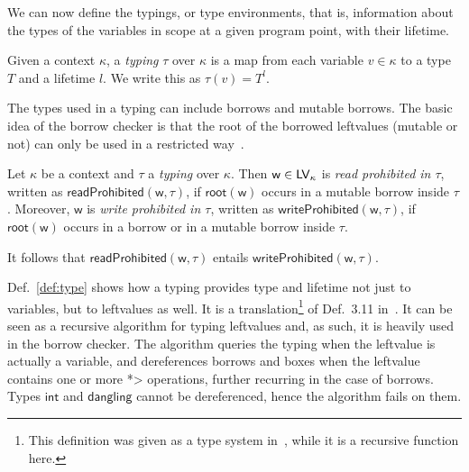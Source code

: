 We can now define the typings, or type environments, that is,
information about the types of the variables in scope at a given program point,
with their lifetime.

\begin{definition}[Typing]\label{def:typing}
  Given a context $\kappa$, a \emph{typing} $\tau$ over $\kappa$ is
  a map from each variable $v\in\kappa$ to a type $T$ and a lifetime $l$.
  We write this as $\tau(v)=T^l$.
\end{definition}

The types used in a typing can include borrows and mutable borrows.
The basic idea of the borrow checker is that the root of the
borrowed leftvalues (mutable or not) can only be used
in a restricted way~\cite{Pea21}.

\begin{definition}\label{def:prohibited}
  Let $\kappa$ be a context and $\tau$ a \emph{typing} over $\kappa$.
  Then $\mathsf{w}\in\mathsf{LV}_\kappa$ is
  \emph{read prohibited in $\tau$},
  written as $\mathsf{readProhibited}(\mathsf{w},\tau)$,
  if $\mathsf{root}(\mathsf{w})$ occurs in a mutable borrow inside $\tau$.
  Moreover, $\mathsf{w}$ is \emph{write prohibited in $\tau$}, written
  as $\mathsf{writeProhibited}(\mathsf{w},\tau)$,
  if $\mathsf{root}(\mathsf{w})$ occurs in a borrow or in a
  mutable borrow inside $\tau$.
\end{definition}

\noindent
It follows that $\mathsf{readProhibited}(\mathsf{w},\tau)$ entails
$\mathsf{writeProhibited}(\mathsf{w},\tau)$.

Def.~\ref{def:type} shows how a typing provides type and lifetime not just to variables,
but to leftvalues as well.
It is a translation\footnote{This definition was given as a type system in~\cite{Pea21}, while it is a recursive function here.} of
Def.~3.11 in~\cite{Pea21}.
It can be seen as a recursive algorithm for typing leftvalues
and, as such, it is heavily used in the borrow checker.
The algorithm queries the typing when the leftvalue is actually a variable,
and dereferences borrows and boxes when the leftvalue contains one or more
\<*> operations, further recurring in the case of borrows.
Types $\mathsf{int}$ and $\mathsf{dangling}$ cannot be dereferenced, hence the
algorithm fails on them.

